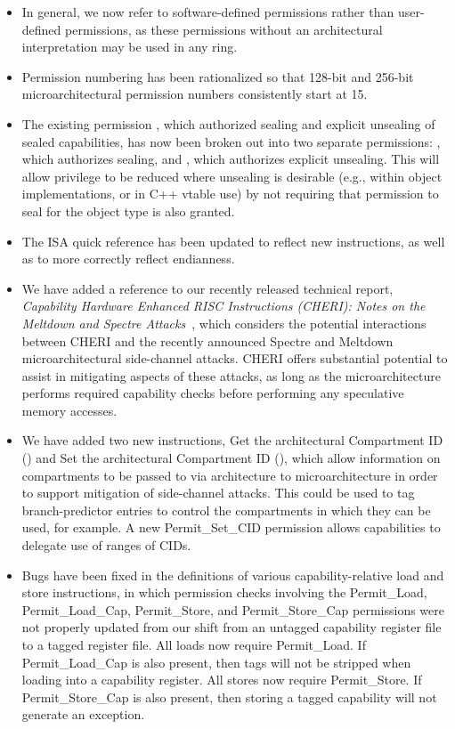 \begin{itemize}
\item In general, we now refer to software-defined permissions rather than
user-defined permissions, as these permissions without an architectural
interpretation may be used in any ring.

\item Permission numbering has been rationalized so that 128-bit and 256-bit
microarchitectural permission numbers consistently start at 15.

\item The existing permission \cappermSeal, which authorized sealing and
explicit unsealing of sealed capabilities, has now been broken out into two
separate permissions: \cappermSeal, which authorizes sealing, and
\cappermUnseal, which authorizes explicit unsealing.
This will allow privilege to be reduced where unsealing is desirable (e.g.,
within object implementations, or in C++ vtable use) by not requiring that
permission to seal for the object type is also granted.

\item The ISA quick reference has been updated to reflect new instructions, as
well as to more correctly reflect endianness.

\item We have added a reference to our recently released technical report, \textit{Capability
Hardware Enhanced RISC Instructions (CHERI): Notes on the Meltdown and
Spectre Attacks}~\cite{UCAM-CL-TR-916}, which considers the potential
interactions between CHERI and the recently announced Spectre and Meltdown
microarchitectural side-channel attacks.
CHERI offers substantial potential to assist in mitigating aspects of these
attacks, as long as the microarchitecture performs required capability
checks before performing any speculative memory accesses.

\item We have added two new instructions, Get the architectural Compartment ID
() and Set the architectural Compartment ID
(), which allow information on compartments to
be passed to via architecture to microarchitecture in order to support
mitigation of side-channel attacks.
This could be used to tag branch-predictor entries to control the
compartments in which they can be used, for example.
A new Permit\_Set\_CID permission allows capabilities to delegate use of
ranges of CIDs.

\item Bugs have been fixed in the definitions of various capability-relative
load and store instructions, in which permission checks involving the
Permit\_Load, Permit\_Load\_Cap, Permit\_Store, and Permit\_Store\_Cap
permissions were not properly updated from our shift from an untagged
capability register file to a tagged register file.
All loads now require Permit\_Load.
If Permit\_Load\_Cap is also present, then tags will not be stripped when
loading into a capability register.
All stores now require Permit\_Store.
If Permit\_Store\_Cap is also present, then storing a tagged capability will
not generate an exception.


\end{itemize}
